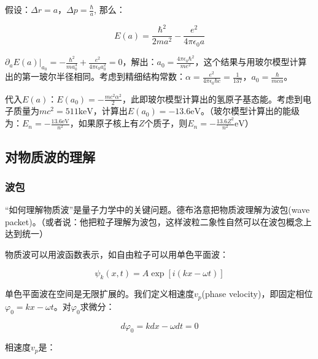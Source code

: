 假设：$\Delta r =a$，$\Delta p = \frac{\hbar}{a}$, 那么：

\begin{equation*}
  E(a) = \frac{\hbar^2}{2m a^2} - \frac{e^2}{4 \pi \epsilon_0 a}
\end{equation*}



$\partial_a E(a) |_{a_0}= - \frac{\hbar^2}{m a_0^3} + \frac{e^2}{4
\pi \epsilon_0 a_0^2} = 0$，解出：$a_0 = \frac{4 \pi \epsilon_0
\hbar^2}{me^2}$，这个结果与用玻尔模型计算出的第一玻尔半径相同。考虑到精细结构常数：$\alpha
= \frac{e^2}{4 \pi \epsilon_0 \hbar c} = \frac{1}{137}$，$a_0 =
\frac{\hbar}{mc \alpha}$。

代入$E(a)$：$E(a_0) = - \frac{m c^2
\alpha^2}{2}$，此即玻尔模型计算出的氢原子基态能。考虑到电子质量为$mc^2
= 511 \text{keV}$，计算出$E(a_0) = -13.6
\text{eV}$。（玻尔模型计算出的能级为：$E_n = - \frac{13.6
\text{eV}}{n^2}$，如果原子核上有$Z$个质子，则$E_n = - \frac{13.6
Z^2}{n^2} \text{eV}$）




\subsection{对物质波的理解}

\subsubsection*{波包}


``如何理解物质波''是量子力学中的关键问题。德布洛意把物质波理解为波包(wave
packet)。（或者说：他把粒子理解为波包，这样波粒二象性自然可以在波包概念上达到统一）


物质波可以用波函数表示，如自由粒子可以用单色平面波： 

\begin{equation}
\psi _k (x,t) = A \exp \left[ {i(kx - \omega t)} \right]
\end{equation}

单色平面波在空间是无限扩展的。我们定义相速度$v_p$(phase velocity)，即固定相位$\varphi_0 = kx - \omega t$。对$\varphi_0$求微分：

\begin{equation}
d \varphi_0 = k dx - \omega dt  = 0
\end{equation}

相速度$v_p$是：

